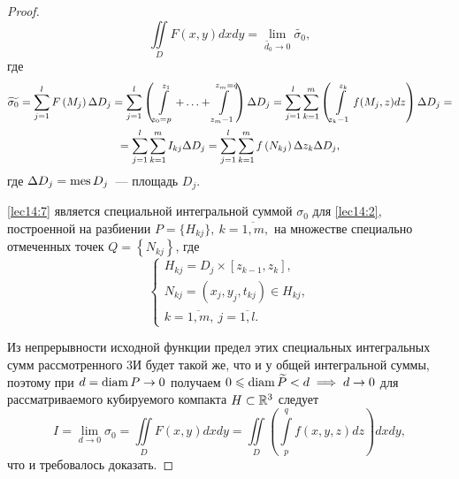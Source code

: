 \documentclass[../../main.tex]{subfiles}
\begin{document}
\begin{proof}
		\begin{equation}
		\iint\limits_D F\left(x, y\right) dxdy = \lim\limits_{\widetilde{d_0} 
		\to 0} \widetilde{\sigma_0}, \label{lec14:6}
		\end{equation}
		где 
		\begin{equation}
		\begin{gathered}
		\widetilde{\sigma_0} = \sum\limits_{j = 1}^{l} F\left(M_j\right) \Delta 
		D_j = \sum\limits_{j = 1}^{l}
		\left(\int\limits_{z_0 = p}^{z_1} + \ldots + \int\limits_{z_m - 
		1}^{z_m = q} \right)\Delta D_j = \sum\limits_{j = 1}^{l} \sum\limits_{k = 1}^{m} 
		\left(\int\limits_{z_k - 1}^{z_k} f(M_j, z)dz\right) \Delta D_j = \\ 
		= \sum\limits_{j = 1}^{l} \sum\limits_{k = 1}^{m} I_{kj} \Delta D_j = 
		\sum\limits_{j = 1}^{l} \sum\limits_{k = 1}^{m} f\left(N_{kj}\right) \Delta 
		z_k \Delta D_j, \label{lec14:7}
		\end{gathered}
		\end{equation}
		где $\Delta D_j = \operatorname{mes} D_j$~--- площадь $D_j$.
		
		\eqref{lec14:7} является специальной интегральной суммой $\sigma_0$ для 
		\eqref{lec14:2}, построенной на разбиении $P = \{ H_{kj} \},\ k = 
		\overline{1, m},$ на множестве специально отмеченных точек $Q = \left\{ 
		N_{kj}\right\}$, где 
		\[
		\begin{cases}
		H_{kj} = D_j \times \left[z_{k - 1}, z_k\right],\\
		N_{kj} = (x_j, y_j, t_{kj}) \in H_{kj}, \\
		k = \overline{1, m}, \ j = \overline{1, l}.
		\end{cases} 
		\]
		
		Из непрерывности исходной функции предел этих специальных интегральных сумм 
		рассмотренного 3И будет такой же, что и у общей интегральной суммы, поэтому 
		при $d = \operatorname{diam} P \to 0$ получаем $0 \leqslant \operatorname{diam} \widetilde{P} < d \implies d 
		\to 0$ для рассматриваемого кубируемого компакта $H \subset \mathbb{R}^3$ следует
		\begin{equation}
		I = \lim\limits_{d \to 0} \sigma_0 = \iint\limits_D  F\left(x, y\right) dxdy 
		= 
		\iint\limits_D \left(\int\limits_{p}^{q} f(x, y,z) dz\right) 
		dxdy, \label{lec14:9}
		\end{equation}
		что и требовалось доказать.
	\end{proof}
	
\end{document}
